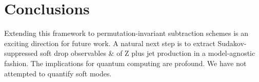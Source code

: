 \section{Conclusions}\label{sec:conclusions}

Extending this framework to permutation-invariant subtraction schemes is
an exciting direction for future work. A natural next step is to extract
Sudakov-suppressed soft drop observables & of Z plus jet production in a
model-agnostic fashion. The implications for quantum computing are
profound. We have not attempted to quantify soft modes.

